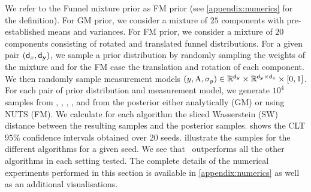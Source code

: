 \vspace{-.3mm}
We refer to the Funnel mixture prior as FM prior (see \cref{appendix:numerics} for the definition).
For GM prior, we consider a mixture of $25$ components with pre-established means and variances.
For FM prior, we consider a mixture of $20$ components consisting of rotated and translated funnel distributions.
For a given pair $({\mathsf{d}_x}, {\mathsf{d}_{\mathbf{y}}})$, we sample a prior distribution by randomly sampling the weights of the mixture and
for the FM case the translation and rotation of each component.
We then randomly sample measurement models $(y, \mathrm{A}, \sigma_y) \in \mathbb{R}^{{\mathsf{d}_{\mathbf{y}}}} \times \mathbb{R}^{{\mathsf{d}_{\mathbf{y}}} \times {\mathsf{d}_x}} \times [0, 1]$.
For each pair of prior distribution and measurement model, we generate $10^4$ samples from \algo, \dps, \ddrm, \rnvp,
and from the posterior either analytically (GM) or using NUTS (FM).
We calculate for each algorithm the sliced Wasserstein (SW) distance between the resulting samples and the posterior samples.
 shows the CLT $95\%$ confidence intervals obtained over $20$ seeds.
 illustrate the samples for the different algorithms for a given seed.
We see that \algo\ outperforms all the other algorithms in each setting tested.
The complete details of the numerical experiments performed in this section is available in \cref{appendix:numerics} as well as an additional visualisations.